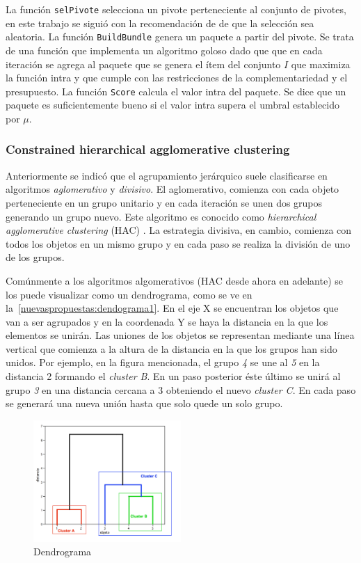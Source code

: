 La función \texttt{selPivote} selecciona un pivote perteneciente al conjunto de pivotes, en este trabajo se siguió con la recomendación de \cite{Zhang:2002:ESI:638644.638646} de que la selección sea aleatoria. La función \texttt{BuildBundle} genera un paquete a partir del pivote. Se trata de una función que implementa un algoritmo goloso dado que que en cada iteración se agrega al paquete que se genera el ítem del conjunto $I$ que maximiza la función intra y que cumple con las restricciones de la complementariedad y el presupuesto. La función \texttt{Score} calcula el valor intra del paquete. Se dice que un paquete es suficientemente bueno si el valor intra supera el umbral establecido por $\mu$.

\subsubsection{Constrained hierarchical agglomerative clustering}
Anteriormente se indicó que el agrupamiento jerárquico suele clasificarse en algoritmos \textit{aglomerativo} y \textit{divisivo}. El aglomerativo, comienza con cada objeto perteneciente en un grupo unitario y en cada iteración se unen dos grupos generando un grupo nuevo. Este algoritmo es conocido como \textit{hierarchical agglomerative clustering} (HAC) \cite{journals/tkde/Amer-YahiaBCFMZ14}. La estrategia divisiva, en cambio, comienza con todos los objetos en un mismo grupo y en cada paso se realiza la división de uno de los grupos.

Comúnmente a los algoritmos algomerativos (HAC desde ahora en adelante) se los puede visualizar como un dendrograma, como se ve en la~\autoref{nuevaspropuestas:dendograma1}. En el eje X se encuentran los objetos que van a ser agrupados y en la coordenada Y se haya la distancia en la que los elementos se unirán. Las uniones de los objetos se representan mediante una línea vertical que comienza a la altura de la distancia en la que los grupos han sido unidos. Por ejemplo, en la figura mencionada, el grupo \textit{4} se une al \textit{5} en la distancia 2 formando el \textit{cluster B}. En un paso posterior éste último se unirá al grupo \textit{3} en una distancia cercana a 3 obteniendo el nuevo \textit{cluster C}. En cada paso se generará una nueva unión hasta que solo quede un solo grupo.

\begin{figure}[H]
  \centering
    \includegraphics[width=0.5\textwidth]{img/dendograma01.png}
  \caption{Dendrograma}
  \label{nuevaspropuestas:dendograma1}
\end{figure}

